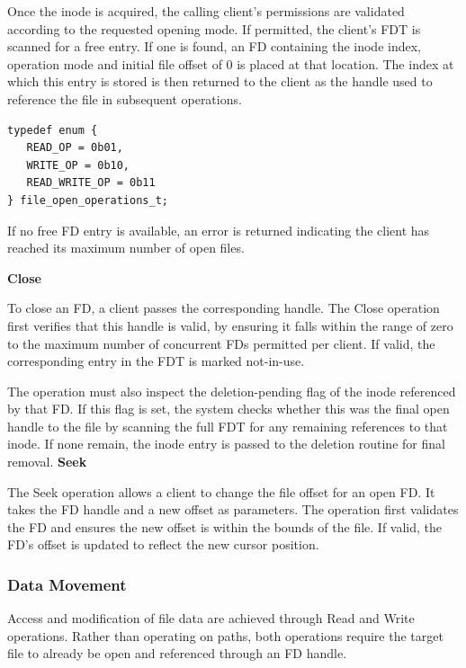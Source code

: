 Once the inode is acquired, the calling client’s permissions are validated according to the requested opening mode. If permitted, the client’s FDT is scanned for a free entry. If one is found, an FD containing the inode index, operation mode and initial file offset of 0 is placed at that location. The index at which this entry is stored is then returned to the client as the handle used to reference the file in subsequent operations.

\vspace{0.3cm}
\begin{lstlisting}[caption={File opening mode enum.}, label={lst:file-open-ops}]
typedef enum {
   READ_OP = 0b01,
   WRITE_OP = 0b10,
   READ_WRITE_OP = 0b11
} file_open_operations_t;
\end{lstlisting}
\vspace{-0.4cm}

If no free FD entry is available, an error is returned indicating the client has reached its maximum number of open files.

\textbf{Close}

To close an FD, a client passes the corresponding handle. The Close operation first verifies that this handle is valid, by ensuring it falls within the range of zero to the maximum number of concurrent FDs permitted per client. If valid, the corresponding entry in the FDT is marked not-in-use.

The operation must also inspect the deletion-pending flag of the inode referenced by that FD. If this flag is set, the system checks whether this was the final open handle to the file by scanning the full FDT for any remaining references to that inode. If none remain, the inode entry is passed to the deletion routine for final removal.
\newpage
\textbf{Seek}

The Seek operation allows a client to change the file offset for an open FD. It takes the FD handle and a new offset as parameters. The operation first validates the FD and ensures the new offset is within the bounds of the file. If valid, the FD’s offset is updated to reflect the new cursor position.

\subsubsection{Data Movement}

Access and modification of file data are achieved through Read and Write operations. Rather than operating on paths, both operations require the target file to already be open and referenced through an FD handle.

